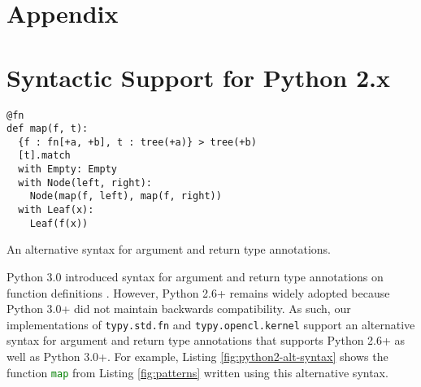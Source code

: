\documentclass[10pt]{sigplanconf}
\newcommand{\lip}[1]{\lstinline[language=Python,basicstyle=\ttfamily\footnotesize,morekeywords={with},deletendkeywords={tuple,buffer,map}]{#1}}
\newcommand{\li}[1]{\lip{#1}}
\begin{document}
\clearpage
\appendix
\section*{Appendix}
\section{Syntactic Support for Python 2.x}\label{sec:python2-support}
\begin{codelisting}[h!]
\vspace{-3px}
\begin{lstlisting}
@fn
def map(f, t):
  {f : fn[+a, +b], t : tree(+a)} > tree(+b)
  [t].match 
  with Empty: Empty 
  with Node(left, right): 
    Node(map(f, left), map(f, right))
  with Leaf(x):
    Leaf(f(x)) 
\end{lstlisting}
\caption{An alternative syntax for argument and return type annotations.}
\label{fig:python2-alt-syntax}
\end{codelisting}

\noindent Python 3.0 introduced syntax for argument and return type annotations on function definitions \cite{pep3107}. However, Python 2.6+ remains widely adopted because Python 3.0+ did not maintain backwards compatibility. As such, our implementations of \li{typy.std.fn} and \li{typy.opencl.kernel} support an alternative syntax for argument and return type annotations that supports Python 2.6+ as well as Python 3.0+. For example, Listing \ref{fig:python2-alt-syntax} shows the function \li{map} from Listing \ref{fig:patterns} written using this alternative syntax.
\end{document}

